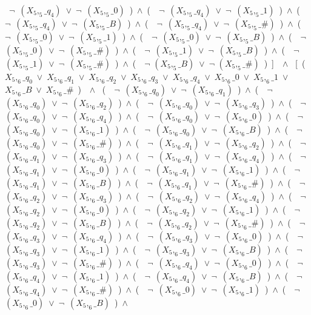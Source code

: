 ﻿\documentclass[a4paper,10pt]{article}
\begin{document}
\ $\neg$\ $(X_5,_5\_q_4)$\ $\vee$\ $\neg$\ $(X_5,_5\_0)$\ )\ $\wedge$\ (\ \ $\neg$\ $(X_5,_5\_q_4)$\ $\vee$\ $\neg$\ $(X_5,_5\_1)$\ )\ $\wedge$\ (\ \ $\neg$\ $(X_5,_5\_q_4)$\ $\vee$\ $\neg$\ $(X_5,_5\_B)$\ )\ $\wedge$\ (\ \ $\neg$\ $(X_5,_5\_q_4)$\ $\vee$\ $\neg$\ $(X_5,_5\_\#)$\ )\ $\wedge$\ (\ \ $\neg$\ $(X_5,_5\_0)$\ $\vee$\ $\neg$\ $(X_5,_5\_1)$\ )\ $\wedge$\ (\ \ $\neg$\ $(X_5,_5\_0)$\ $\vee$\ $\neg$\ $(X_5,_5\_B)$\ )\ $\wedge$\ (\ \ $\neg$\ $(X_5,_5\_0)$\ $\vee$\ $\neg$\ $(X_5,_5\_\#)$\ )\ $\wedge$\ (\ \ $\neg$\ $(X_5,_5\_1)$\ $\vee$\ $\neg$\ $(X_5,_5\_B)$\ )\ $\wedge$\ (\ \ $\neg$\ $(X_5,_5\_1)$\ $\vee$\ $\neg$\ $(X_5,_5\_\#)$\ )\ $\wedge$\ (\ \ $\neg$ $(X_5,_5\_B)$\ $\vee$\ $\neg$ $(X_5,_5\_\#)$\ )\ ]\ \ $\wedge$ \ [\ (\ $X_5,_6\_q_0$\ $\vee$\ $X_5,_6\_q_1$\ $\vee$\ $X_5,_6\_q_2$\ $\vee$\ $X_5,_6\_q_3$\ $\vee$\ $X_5,_6\_q_4$\ $\vee$\ $X_5,_6\_0$\ $\vee$\ $X_5,_6\_1$\ $\vee$\ $X_5,_6\_B$\ $\vee$\ $X_5,_6\_\#$\ )\ \ $\wedge$ \ (\ \ $\neg$\ $(X_5,_6\_q_0)$\ $\vee$\ $\neg$\ $(X_5,_6\_q_1)$\ )\ $\wedge$\ (\ \ $\neg$\ $(X_5,_6\_q_0)$\ $\vee$\ $\neg$\ $(X_5,_6\_q_2)$\ )\ $\wedge$\ (\ \ $\neg$\ $(X_5,_6\_q_0)$\ $\vee$\ $\neg$\ $(X_5,_6\_q_3)$\ )\ $\wedge$\ (\ \ $\neg$\ $(X_5,_6\_q_0)$\ $\vee$\ $\neg$\ $(X_5,_6\_q_4)$\ )\ $\wedge$\ (\ \ $\neg$\ $(X_5,_6\_q_0)$\ $\vee$\ $\neg$\ $(X_5,_6\_0)$\ )\ $\wedge$\ (\ \ $\neg$\ $(X_5,_6\_q_0)$\ $\vee$\ $\neg$\ $(X_5,_6\_1)$\ )\ $\wedge$\ (\ \ $\neg$\ $(X_5,_6\_q_0)$\ $\vee$\ $\neg$\ $(X_5,_6\_B)$\ )\ $\wedge$\ (\ \ $\neg$\ $(X_5,_6\_q_0)$\ $\vee$\ $\neg$\ $(X_5,_6\_\#)$\ )\ $\wedge$\ (\ \ $\neg$\ $(X_5,_6\_q_1)$\ $\vee$\ $\neg$\ $(X_5,_6\_q_2)$\ )\ $\wedge$\ (\ \ $\neg$\ $(X_5,_6\_q_1)$\ $\vee$\ $\neg$\ $(X_5,_6\_q_3)$\ )\ $\wedge$\ (\ \ $\neg$\ $(X_5,_6\_q_1)$\ $\vee$\ $\neg$\ $(X_5,_6\_q_4)$\ )\ $\wedge$\ (\ \ $\neg$\ $(X_5,_6\_q_1)$\ $\vee$\ $\neg$\ $(X_5,_6\_0)$\ )\ $\wedge$\ (\ \ $\neg$\ $(X_5,_6\_q_1)$\ $\vee$\ $\neg$\ $(X_5,_6\_1)$\ )\ $\wedge$\ (\ \ $\neg$\ $(X_5,_6\_q_1)$\ $\vee$\ $\neg$\ $(X_5,_6\_B)$\ )\ $\wedge$\ (\ \ $\neg$\ $(X_5,_6\_q_1)$\ $\vee$\ $\neg$\ $(X_5,_6\_\#)$\ )\ $\wedge$\ (\ \ $\neg$\ $(X_5,_6\_q_2)$\ $\vee$\ $\neg$\ $(X_5,_6\_q_3)$\ )\ $\wedge$\ (\ \ $\neg$\ $(X_5,_6\_q_2)$\ $\vee$\ $\neg$\ $(X_5,_6\_q_4)$\ )\ $\wedge$\ (\ \ $\neg$\ $(X_5,_6\_q_2)$\ $\vee$\ $\neg$\ $(X_5,_6\_0)$\ )\ $\wedge$\ (\ \ $\neg$\ $(X_5,_6\_q_2)$\ $\vee$\ $\neg$\ $(X_5,_6\_1)$\ )\ $\wedge$\ (\ \ $\neg$\ $(X_5,_6\_q_2)$\ $\vee$\ $\neg$\ $(X_5,_6\_B)$\ )\ $\wedge$\ (\ \ $\neg$\ $(X_5,_6\_q_2)$\ $\vee$\ $\neg$\ $(X_5,_6\_\#)$\ )\ $\wedge$\ (\ \ $\neg$\ $(X_5,_6\_q_3)$\ $\vee$\ $\neg$\ $(X_5,_6\_q_4)$\ )\ $\wedge$\ (\ \ $\neg$\ $(X_5,_6\_q_3)$\ $\vee$\ $\neg$\ $(X_5,_6\_0)$\ )\ $\wedge$\ (\ \ $\neg$\ $(X_5,_6\_q_3)$\ $\vee$\ $\neg$\ $(X_5,_6\_1)$\ )\ $\wedge$\ (\ \ $\neg$\ $(X_5,_6\_q_3)$\ $\vee$\ $\neg$\ $(X_5,_6\_B)$\ )\ $\wedge$\ (\ \ $\neg$\ $(X_5,_6\_q_3)$\ $\vee$\ $\neg$\ $(X_5,_6\_\#)$\ )\ $\wedge$\ (\ \ $\neg$\ $(X_5,_6\_q_4)$\ $\vee$\ $\neg$\ $(X_5,_6\_0)$\ )\ $\wedge$\ (\ \ $\neg$\ $(X_5,_6\_q_4)$\ $\vee$\ $\neg$\ $(X_5,_6\_1)$\ )\ $\wedge$\ (\ \ $\neg$\ $(X_5,_6\_q_4)$\ $\vee$\ $\neg$\ $(X_5,_6\_B)$\ )\ $\wedge$\ (\ \ $\neg$\ $(X_5,_6\_q_4)$\ $\vee$\ $\neg$\ $(X_5,_6\_\#)$\ )\ $\wedge$\ (\ \ $\neg$\ $(X_5,_6\_0)$\ $\vee$\ $\neg$\ $(X_5,_6\_1)$\ )\ $\wedge$\ (\ \ $\neg$\ $(X_5,_6\_0)$\ $\vee$\ $\neg$\ $(X_5,_6\_B)$\ )\ $\wedge$\ 
\end{document}
